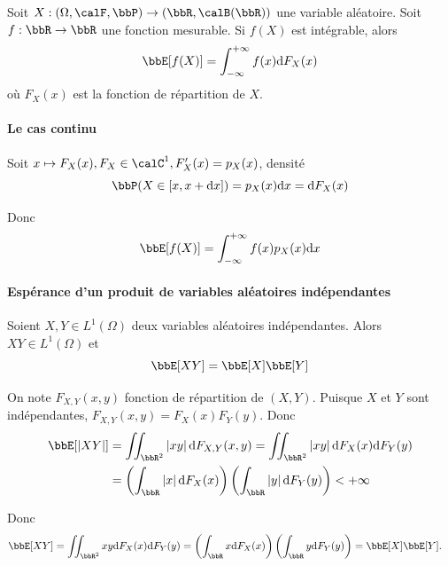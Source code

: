 \begin{prop}
    Soit $X: (\Omega, \calF, \bbP) \to (\bbR, \calB(\bbR))$ une variable aléatoire.
    Soit $f: \bbR \to \bbR$ une fonction mesurable.
    Si $f(X)$ est intégrable, alors
    \[ \bbE[f(X)] = \int_{-\infty}^{+\infty} f(x) \dif F_X(x) \]
    où $F_X(x)$ est la fonction de répartition de $X$.
\end{prop}

\paragraph{Le cas continu} Soit $x \tp F_X(x), F_X \in \calC^1, F_X'(x) = {}p_X(x)$, densité
\[ \bbP(X \in [x, x + \dif x]) = {}p_X(x) \dif x = \dif F_X(x) \]

Donc
\[ \bbE[f(X)] = \int_{-\infty}^{+\infty} f(x) {}p_X(x) \dif x \]

\paragraph{Espérance d'un produit de variables aléatoires indépendantes}

\begin{prop}
    Soient $X, Y \in L^1(\Omega)$ deux variables aléatoires indépendantes.
    Alors $XY \in L^1(\Omega)$ et
    \[ \bbE[XY] = \bbE[X] \bbE[Y] \]
\end{prop}

\begin{rqq}
    On note $F_{X, Y}(x, y)$ fonction de répartition de $(X, Y)$.
    Puisque $X$ et $Y$ sont indépendantes, $F_{X, Y}(x, y) = F_X(x) F_Y(y)$.
    Donc
    \begin{align*}
        \bbE[\lrvert{XY}] & = \iint_{\bbR^2} \lrvert{xy} \dif F_{X, Y}(x, y)
        = \iint_{\bbR^2} \lrvert{xy} \dif F_X(x) \dif F_Y(y)                                                                        \\
                          & = \left(\int_\bbR \lrvert{x} \dif F_X(x)\right) \left(\int_\bbR \lrvert{y} \dif F_Y(y)\right) < +\infty
    \end{align*}

    Donc
    \begin{align*}
        \bbE[XY] & = \iint_{\bbR^2} xy \dif F_X(x) \dif F_Y(y)
        = \left(\int_\bbR x \dif F_X(x)\right) \left(\int_\bbR y \dif F_Y(y)\right)
        = \bbE[X] \bbE[Y].
    \end{align*}
\end{rqq}


